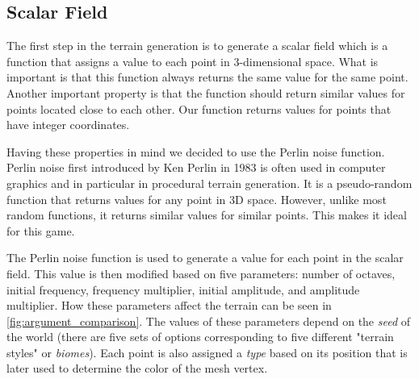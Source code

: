 \subsection{Scalar Field} \label{subsec:scalar_field}
The first step in the terrain generation is to generate a scalar field which is a function that assigns a value to each point in 3-dimensional space.
What is important is that this function always returns the same value for the same point.
Another important property is that the function should return similar values for points located close to each other.
Our function returns values for points that have integer coordinates.

Having these properties in mind we decided to use the Perlin noise function.
Perlin noise first introduced by Ken Perlin in 1983 \cite{Perlin-Noise} is often used in computer graphics and in particular in procedural terrain generation.
It is a pseudo-random function that returns values for any point in 3D space.
However, unlike most random functions, it returns similar values for similar points.
This makes it ideal for this game.

The Perlin noise function is used to generate a value for each point in the scalar field.
This value is then modified based on five parameters: number of octaves, initial frequency, frequency multiplier, initial amplitude, and amplitude multiplier.
How these parameters affect the terrain can be seen in \autoref{fig:argument_comparison}.
The values of these parameters depend on the \textit{seed} of the world (there are five sets of options corresponding to five different "terrain styles" or \textit{biomes}).
Each point is also assigned a \textit{type} based on its position that is later used to determine the color of the mesh vertex.

